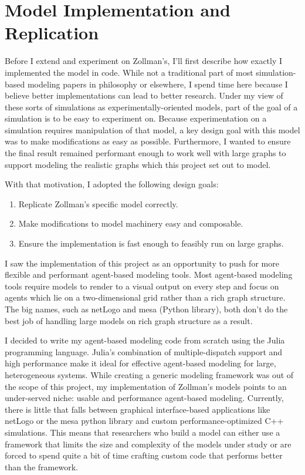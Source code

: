 \hypertarget{model-implementation-and-replication}{%
\chapter{Model Implementation and
Replication}\label{model-implementation-and-replication}}

Before I extend and experiment on Zollman's, I'll first describe how
exactly I implemented the model in code. While not a traditional part of
most simulation-based modeling papers in philosophy or elsewhere, I
spend time here because I believe better implementations can lead to
better research. Under my view of these sorts of simulations as
experimentally-oriented models, part of the goal of a simulation is to
be easy to experiment on. Because experimentation on a simulation
requires manipulation of that model, a key design goal with this model
was to make modifications as easy as possible. Furthermore, I wanted to
ensure the final result remained performant enough to work well with
large graphs to support modeling the realistic graphs which this project
set out to model.

With that motivation, I adopted the following design goals:

\begin{enumerate}
\def\labelenumi{\arabic{enumi}.}
\tightlist
\item
  Replicate Zollman's specific model correctly.
\item
  Make modifications to model machinery easy and composable.
\item
  Ensure the implementation is fast enough to feasibly run on large
  graphs.
\end{enumerate}

I saw the implementation of this project as an opportunity to push for
more flexible and performant agent-based modeling tools. Most
agent-based modeling tools require models to render to a visual output
on every step and focus on agents which lie on a two-dimensional grid
rather than a rich graph structure. The big names, such as netLogo and
mesa (Python library), both don't do the best job of handling large
models on rich graph structure as a result.

I decided to write my agent-based modeling code from scratch using the
Julia programming language. Julia's combination of multiple-dispatch
support and high performance make it ideal for effective agent-based
modeling for large, heterogeneous systems. While creating a generic
modeling framework was out of the scope of this project, my
implementation of Zollman's models points to an under-served niche:
usable and performance agent-based modeling. Currently, there is little
that falls between graphical interface-based applications like netLogo
or the mesa python library and custom performance-optimized C++
simulations. This means that researchers who build a model can either
use a framework that limits the size and complexity of the models under
study or are forced to spend quite a bit of time crafting custom code
that performs better than the framework.

